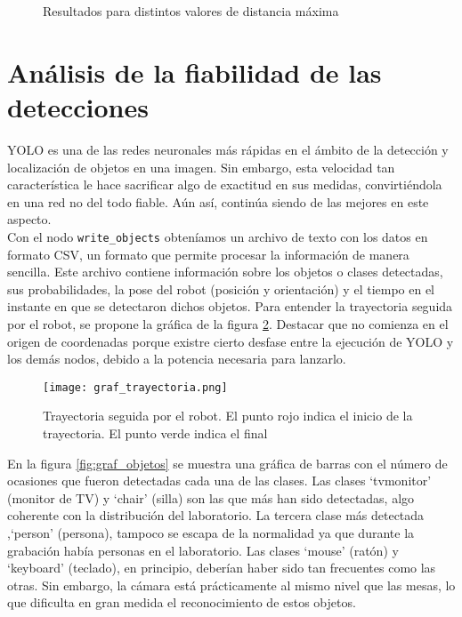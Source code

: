 \begin{figure}[H]
 \centering
 \caption{Resultados para distintos valores de distancia máxima}
 \label{fig:scans_range}
\end{figure}


\section{Análisis de la fiabilidad de las detecciones}

YOLO es una de las redes neuronales más rápidas en el ámbito de la detección y localización de objetos en una imagen. Sin embargo, esta velocidad tan característica le hace sacrificar algo de exactitud en sus medidas, convirtiéndola en una red no del todo fiable. Aún así, continúa siendo de las mejores en este aspecto.\\

Con el nodo \texttt{write\_objects} obteníamos un archivo de texto con los datos en formato CSV, un formato que permite procesar la información de manera sencilla. Este archivo contiene información sobre los objetos o clases detectadas, sus probabilidades, la pose del robot (posición y orientación) y el tiempo en el instante en que se detectaron dichos objetos. Para entender la trayectoria seguida por el robot, se propone la gráfica de la figura \ref{fig:graf_trayectoria}. Destacar que no comienza en el origen de coordenadas porque existre cierto desfase entre la ejecución de YOLO y los demás nodos, debido a la potencia necesaria para lanzarlo.\\

\begin{figure}[h]
	\begin{center} 
		\texttt{[image: graf\_trayectoria.png]}
	\end{center}
	\caption{Trayectoria seguida por el robot. El punto rojo indica el inicio de la trayectoria. El punto verde indica el final}
	\label{fig:graf_trayectoria}
\end{figure}

En la figura \ref{fig:graf_objetos} se muestra una gráfica de barras con el número de ocasiones que fueron detectadas cada una de las clases. Las clases `tvmonitor' (monitor de TV) y `chair' (silla) son las que más han sido detectadas, algo coherente con la distribución del laboratorio. La tercera clase más detectada ,`person' (persona), tampoco se escapa de la normalidad ya que durante la grabación había personas en el laboratorio. Las clases `mouse' (ratón) y `keyboard' (teclado), en principio, deberían haber sido tan frecuentes como las otras. Sin embargo, la cámara está prácticamente al mismo nivel que las mesas, lo que dificulta en gran medida el reconocimiento de estos objetos.\\

